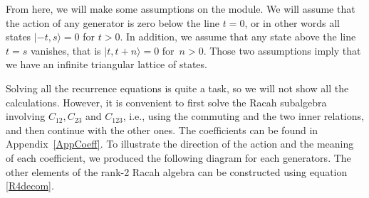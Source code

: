 \documentclass[10pt,a4paper]{amsart}
\numberwithin{equation}{section}
\begin{document}
From here, we will make some assumptions on the module. We will assume that the action of any generator is zero below the line $t=0$, or in other words all states $|{-}t,s\rangle=0$ for $t>0$. In addition, we assume that any state above the line $t=s$ vanishes, that is $\vert t,t+n\rangle=0$ for~${n>0}$. Those two assumptions imply that we have an infinite triangular lattice of states.

Solving all the recurrence equations is quite a task, so we will not show all the calculations. However, it is convenient to first solve the Racah subalgebra involving $C_{12},C_{23}$ and $C_{123}$, i.e., using the commuting and the two inner relations, and then continue with the other ones. The coefficients can be found in Appendix~\ref{AppCoeff}. To illustrate the direction of the action and the meaning of each coefficient, we produced the following diagram for each generators.
The other elements of the rank-2 Racah algebra can be constructed using equation \eqref{R4decom}.
\end{document}

